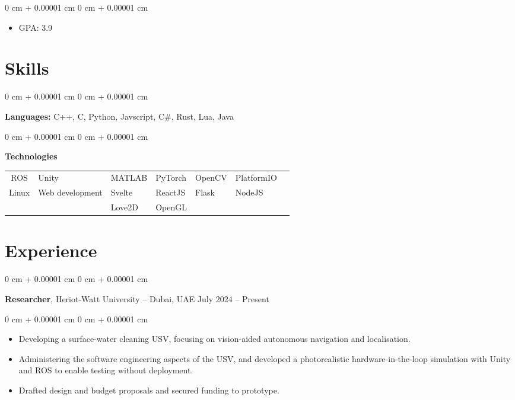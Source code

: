 \documentclass[10pt, letterpaper]{article}
\newenvironment{highlights}{
    \begin{itemize}[
        topsep=0.10 cm,
        parsep=0.10 cm,
        partopsep=0pt,
        itemsep=0pt,
        leftmargin=0 cm + 10pt
    ]
}{
    \end{itemize}
} %
\newenvironment{onecolentry}{
    \begin{adjustwidth}{
        0 cm + 0.00001 cm
    }{
        0 cm + 0.00001 cm
    }
}{
    \end{adjustwidth}
} %
\newenvironment{twocolentry}[2][]{
    \onecolentry
    \def\secondColumn{#2}
    \setcolumnwidth{\fill, 4.5 cm}
    \begin{paracol}{2}
}{
    \switchcolumn \raggedleft \secondColumn
    \end{paracol}
    \endonecolentry
} %
\begin{document}
        \vspace{0.10 cm}
        \begin{onecolentry}
            \begin{highlights}
                \item GPA: 3.9
            \end{highlights}
        \end{onecolentry}


    \section{Skills}

        \begin{onecolentry}
            \textbf{Languages:} C++, C, Python, Javscript, C\#, Rust, Lua, Java
        \end{onecolentry}

        \vspace{0.2 cm}

        \begin{onecolentry}
        \textbf{Technologies}
        \begin{tabularx}{\textwidth}{c *{6}{Y}}
            ROS & Unity & MATLAB & PyTorch & OpenCV & PlatformIO \\ Linux & Web development & Svelte & ReactJS & Flask & NodeJS \\ & & Love2D & OpenGL
        \end{tabularx}
    \end{onecolentry}

    
    \section{Experience}

        \begin{twocolentry}{
            July 2024 – Present
        }
        \textbf{Researcher}, Heriot-Watt University -- Dubai, UAE\end{twocolentry}

        \vspace{0.10 cm}
        \begin{onecolentry}
            \begin{highlights}
                \item Developing a surface-water cleaning USV, focusing on vision-aided autonomous navigation and localisation.
                \item Administering the software engineering aspects of the USV, and developed a photorealistic hardware-in-the-loop simulation with Unity and ROS to enable testing without deployment.
                \item Drafted design and budget proposals and secured funding to prototype.
            \end{highlights}
        \end{onecolentry}
\end{document}
